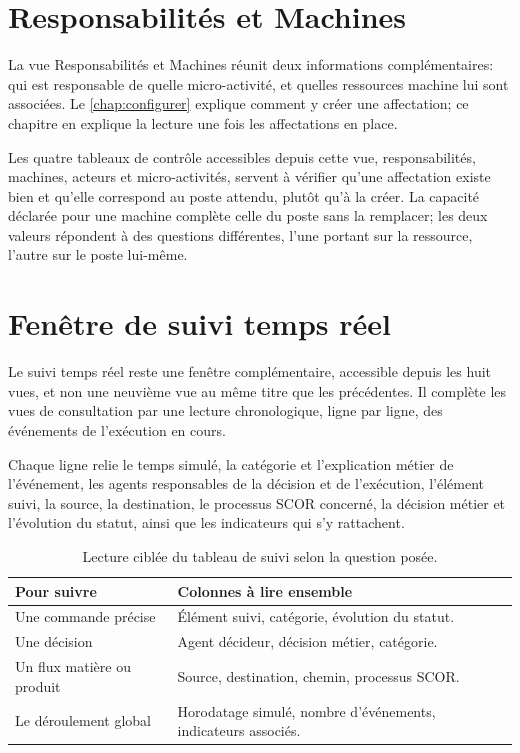 \section{Responsabilités et Machines}

La vue Responsabilités et Machines réunit deux informations complémentaires: qui est responsable de quelle micro-activité, et quelles ressources machine lui sont associées. Le \cref{chap:configurer} explique comment y créer une affectation; ce chapitre en explique la lecture une fois les affectations en place.


Les quatre tableaux de contrôle accessibles depuis cette vue, responsabilités, machines, acteurs et micro-activités, servent à vérifier qu'une affectation existe bien et qu'elle correspond au poste attendu, plutôt qu'à la créer. La capacité déclarée pour une machine complète celle du poste sans la remplacer; les deux valeurs répondent à des questions différentes, l'une portant sur la ressource, l'autre sur le poste lui-même.

\section{Fenêtre de suivi temps réel}

Le suivi temps réel reste une fenêtre complémentaire, accessible depuis les huit vues, et non une neuvième vue au même titre que les précédentes. Il complète les vues de consultation par une lecture chronologique, ligne par ligne, des événements de l'exécution en cours.


Chaque ligne relie le temps simulé, la catégorie et l'explication métier de l'événement, les agents responsables de la décision et de l'exécution, l'élément suivi, la source, la destination, le processus SCOR concerné, la décision métier et l'évolution du statut, ainsi que les indicateurs qui s'y rattachent.

\begin{table}[H]
  \centering
  \begin{tabularx}{\textwidth}{L{0.20\textwidth} Y}
    \toprule
    Pour suivre & Colonnes à lire ensemble \\
    \midrule
    Une commande précise & Élément suivi, catégorie, évolution du statut. \\
    Une décision & Agent décideur, décision métier, catégorie. \\
    Un flux matière ou produit & Source, destination, chemin, processus SCOR. \\
    Le déroulement global & Horodatage simulé, nombre d'événements, indicateurs associés. \\
    \bottomrule
  \end{tabularx}
  \caption{Lecture ciblée du tableau de suivi selon la question posée.}
  \label{tab:suivi-lecture-ciblee}
\end{table}

